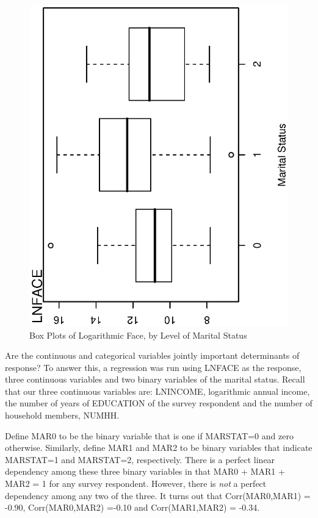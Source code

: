 \begin{figure}[htp]
  \begin{center}
    \includegraphics[width=1\textwidth,angle=270,scale=0.5]{Chapter4/F4BoxFACEMARSTAT.ps}
       \caption{\label{F4:BoxFACEMARSTAT} \small  Box Plots of Logarithmic Face, by Level of Marital Status}
  \end{center}
\end{figure}

Are the continuous and categorical variables jointly important
determinants of response? To answer this, a regression was run using
LNFACE as the response, three continuous variables and two binary
variables of the marital status. Recall that our three continuous
variables are:  LNINCOME, logarithmic annual income, the number of
years of EDUCATION of the survey respondent and the number of
household members, NUMHH.

Define MAR0 to be the binary variable that is one if MARSTAT=0 and
zero otherwise. Similarly, define MAR1 and MAR2 to be binary
variables that indicate MARSTAT=1 and MARSTAT=2, respectively. There
is a perfect linear dependency among these three binary variables in
that MAR0 + MAR1 + MAR2 = 1 for any survey respondent. However,
there is \emph{not} a perfect dependency among any two of the three.
It turns out that Corr(MAR0,MAR1) = -0.90, Corr(MAR0,MAR2) =-0.10
and Corr(MAR1,MAR2) = -0.34.



